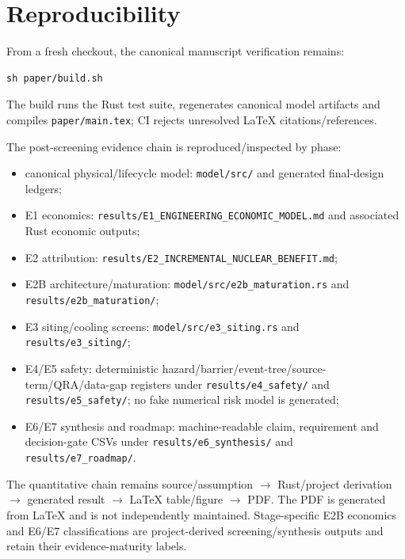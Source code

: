 \section{Reproducibility}
From a fresh checkout, the canonical manuscript verification remains:
\begin{verbatim}
sh paper/build.sh
\end{verbatim}
The build runs the Rust test suite, regenerates canonical model artifacts and compiles \texttt{paper/main.tex}; CI rejects unresolved LaTeX citations/references.

The post-screening evidence chain is reproduced/inspected by phase:
\begin{itemize}
\item canonical physical/lifecycle model: \texttt{model/src/} and generated final-design ledgers;
\item E1 economics: \texttt{results/E1\_ENGINEERING\_ECONOMIC\_MODEL.md} and associated Rust economic outputs;
\item E2 attribution: \texttt{results/E2\_INCREMENTAL\_NUCLEAR\_BENEFIT.md};
\item E2B architecture/maturation: \texttt{model/src/e2b\_maturation.rs} and \texttt{results/e2b\_maturation/};
\item E3 siting/cooling screens: \texttt{model/src/e3\_siting.rs} and \texttt{results/e3\_siting/};
\item E4/E5 safety: deterministic hazard/barrier/event-tree/source-term/QRA/data-gap registers under \texttt{results/e4\_safety/} and \texttt{results/e5\_safety/}; no fake numerical risk model is generated;
\item E6/E7 synthesis and roadmap: machine-readable claim, requirement and decision-gate CSVs under \texttt{results/e6\_synthesis/} and \texttt{results/e7\_roadmap/}.
\end{itemize}

The quantitative chain remains source/assumption $\rightarrow$ Rust/project derivation $\rightarrow$ generated result $\rightarrow$ LaTeX table/figure $\rightarrow$ PDF. The PDF is generated from LaTeX and is not independently maintained. Stage-specific E2B economics and E6/E7 classifications are project-derived screening/synthesis outputs and retain their evidence-maturity labels.
